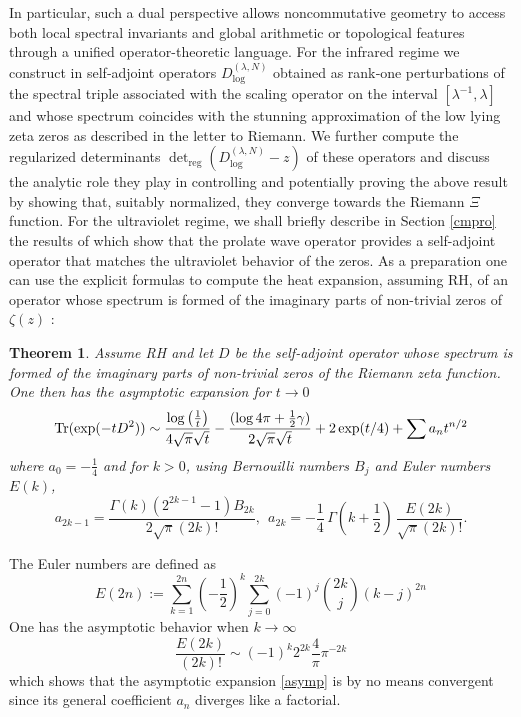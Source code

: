\documentclass{article}
\newtheorem{thm}{Theorem}[section]
\newcommand{\dln}{{D_{\log}^{(\lambda,N)}}}
\def\Tr{{\rm Tr}}
\begin{document}
 In particular, such a dual perspective allows noncommutative geometry to access both local spectral invariants and global arithmetic or topological features through a unified operator-theoretic language.\newline 
 For the infrared regime we construct in \cite{c2mzeta} self‑adjoint operators \( \dln \) obtained as rank‑one perturbations of the spectral triple associated with the scaling operator on the interval \([ \lambda^{-1}, \lambda ]\) and whose spectrum coincides with the stunning approximation of the low lying zeta zeros as described in the letter to Riemann. We further compute the regularized determinants \( \det\nolimits_{\mathrm{reg}}(\dln - z) \) of these operators and discuss the analytic role they play in controlling and potentially proving the above result by showing that, suitably normalized, they converge towards the Riemann $\Xi$ function.\newline  
 For the ultraviolet regime, we shall briefly describe  in Section \ref{cmpro} the results of \cite{CM} which show that the prolate wave operator provides a self-adjoint operator that matches the ultraviolet behavior of the zeros. As a preparation one can use  the explicit formulas  to compute the heat expansion, assuming RH, of an operator whose spectrum is formed of the imaginary parts of non-trivial zeros of $\zeta(z)$ :
 \begin{thm}\label{heatkernelintro}\cite{heatc} Assume RH and let $D$ be the self-adjoint operator whose spectrum is formed of the imaginary parts of non-trivial zeros of the Riemann zeta function. One then has the asymptotic expansion for $t\to 0$
	\begin{equation}\label{asymp}
	\Tr(\exp(-tD^2))\sim \frac{\log \left(\frac{1}{ t}\right) }{4 \sqrt{\pi } \sqrt{t}}-\frac{(\log 4\pi +\frac 12\gamma)}{2\sqrt{ \pi } \sqrt{t}}+2\exp(t/4)+\sum a_n t^{n/2}
\end{equation}
where $a_0=-\frac 14$ and for $k>0$,  using Bernouilli numbers $B_j$ and Euler numbers $E(k)$,
$$a_{2k-1}=
  \frac{\Gamma(k) \left(2^{2k-1}-1\right) B_{2 k}}{2\sqrt \pi(2 k)!}, \ \ a_{2k}=-\frac 14 \, \Gamma(k+\frac 12)\,\frac{E(2k)}{\sqrt \pi(2k)!}.
  $$
\end{thm}
The Euler numbers are defined as 
\begin{equation}\label{euler}
E(2n):=\sum _{k=1}^{2 n} \left(-\frac{1}{2}\right)^k \sum _{j=0}^{2 k} (-1)^j \binom{2 k}{j} (k-j)^{2 n}
 \end{equation}
 One has the asymptotic behavior when $k\to \infty$
$$
\frac{E(2k)}{(2k)!}\sim (-1)^k 2^{2k}\frac 4 \pi \pi^{-2k}
$$
which shows that the asymptotic expansion \eqref{asymp} is by no means convergent since its general coefficient $a_n$ diverges like a factorial.\newline
 
\end{document}
